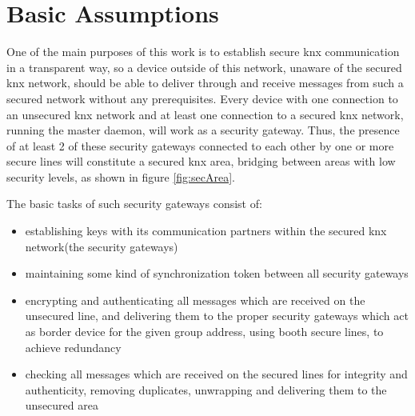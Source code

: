 
\section{Basic Assumptions}

One of the main purposes of this work is to establish secure knx communication in a transparent way, so a device outside of this network, unaware of
the secured knx network, should be able to deliver through and receive messages from such a secured network without any prerequisites. 
Every device with one connection to an unsecured knx network and at least one connection to a secured knx network, running the master daemon, will work
as a security gateway. Thus, the presence of at least 2 of these security gateways connected to each other by one or more secure lines will constitute a 
secured knx area, bridging between areas with low security levels, as shown in figure \ref{fig:secArea}.

The basic tasks of such security gateways consist of:

\begin{itemize}
 \item establishing keys with its communication partners within the secured knx network(the security gateways)
 \item maintaining some kind of synchronization token between all security gateways
 \item encrypting and authenticating all messages which are received on the unsecured line, and delivering them to the proper security gateways which act as border device for 
 the given group address, using booth secure lines, to achieve redundancy
 \item checking all messages which are received on the secured lines for integrity and authenticity, removing duplicates, unwrapping and delivering them to
 the unsecured area
\end{itemize}


